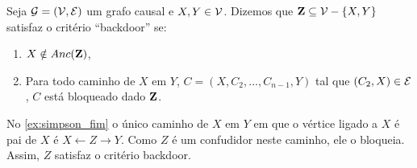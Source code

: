 \begin{definition}
 \label{def:backdoor}
 Seja ${\mathcal G} = ({\mathcal V}, {\mathcal E})$ um grafo causal e $X, Y \in {\mathcal V}$.
 Dizemos que ${\mathbf{Z}} \subseteq {\mathcal V} - \{X,Y\}$ satisfaz 
 o critério ``backdoor'' se:
 \begin{enumerate}
  \item $X \notin Anc({\mathbf{Z}})$,
  \item Para todo caminho de $X$ em $Y$, 
  $C = (X, C_2, \ldots, C_{n-1}, Y)$ tal que
  $(C_2, X) \in {\mathcal E}$, $C$ está bloqueado dado ${\mathbf{Z}}$.
 \end{enumerate}
\end{definition}

\begin{example}
 No \cref{ex:simpson_fim} o único caminho de $X$ em $Y$ em que
 o vértice ligado a $X$ é pai de $X$ é $X \leftarrow Z \rightarrow Y$.
 Como $Z$ é um confudidor neste caminho, ele o bloqueia.
 Assim, $Z$ satisfaz o critério backdoor.
\end{example}


